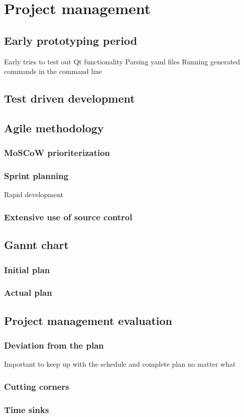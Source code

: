 \section{Project management}

\subsection{Early prototyping period}
Early tries to test out Qt functionality
Parsing yaml files
Running generated commands in the command line

\subsection{Test driven development}

\subsection{Agile methodology}

	\subsubsection{MoSCoW prioriterization}
	
	\subsubsection{Sprint planning}
	Rapid development
	
	\subsubsection{Extensive use of source control}
	
\subsection{Gannt chart}

	\subsubsection{Initial plan}
	
	\subsubsection{Actual plan}	
	
\subsection{Project management evaluation}
	
	\subsubsection{Deviation from the plan}
	Important to keep up with the schedule and complete plan no matter what
	
	\subsubsection{Cutting corners}
	
	\subsubsection{Time sinks}
	

